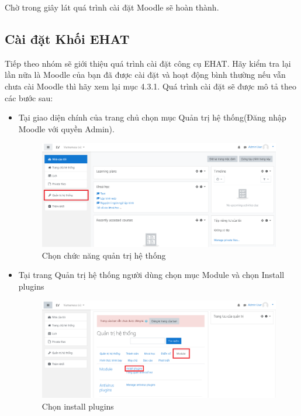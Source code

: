 \vskip 9cm
Chờ trong giây lát quá trình cài đặt Moodle sẽ hoàn thành.

\subsection{Cài đặt Khối EHAT}
Tiếp theo nhóm sẽ giới thiệu quá trình cài đặt công cụ EHAT. Hãy kiểm tra lại lần nữa là Moodle của bạn đã được cài đặt và hoạt động bình thường nếu vẫn chưa cài Moodle thì hãy xem lại mục 4.3.1. Quá trình cài đặt sẽ được mô tả theo các bước sau:

\begin{itemize}
	\item Tại giao diện chính của trang chủ chọn mục Quản trị hệ thống(Đăng nhập Moodle với quyền Admin).
	
	\begin{center}
		\begin{figure}[htp]
			\begin{center}
				\includegraphics[width=1\linewidth]{img/6}
			\end{center}
			\caption{Chọn chức năng quản trị hệ thống}
			\label{refhinh36}
		\end{figure}
	\end{center}
	
	\item Tại trang Quản trị hệ thống người dùng chọn mục Module và chọn Install plugins
	
	\begin{center}
		\begin{figure}[htp]
			\begin{center}
				\includegraphics[width=1\linewidth]{img/7}
			\end{center}
			\caption{Chọn install plugins}
			\label{refhinh37}
		\end{figure}
	\end{center}
	

\end{itemize}

